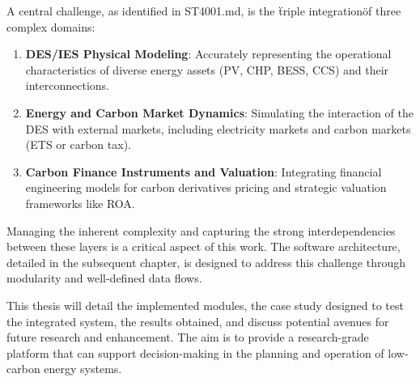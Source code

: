 A central challenge, as identified in ST4001.md, is the \"triple integration\" of three complex domains:
\begin{enumerate}
    \item \textbf{DES/IES Physical Modeling}: Accurately representing the operational characteristics of diverse energy assets (PV, CHP, BESS, CCS) and their interconnections.
    \item \textbf{Energy and Carbon Market Dynamics}: Simulating the interaction of the DES with external markets, including electricity markets and carbon markets (ETS or carbon tax).
    \item \textbf{Carbon Finance Instruments and Valuation}: Integrating financial engineering models for carbon derivatives pricing and strategic valuation frameworks like ROA.
\end{enumerate}
Managing the inherent complexity and capturing the strong interdependencies between these layers is a critical aspect of this work. The software architecture, detailed in the subsequent chapter, is designed to address this challenge through modularity and well-defined data flows.

This thesis will detail the implemented modules, the case study designed to test the integrated system, the results obtained, and discuss potential avenues for future research and enhancement. The aim is to provide a research-grade platform that can support decision-making in the planning and operation of low-carbon energy systems.
